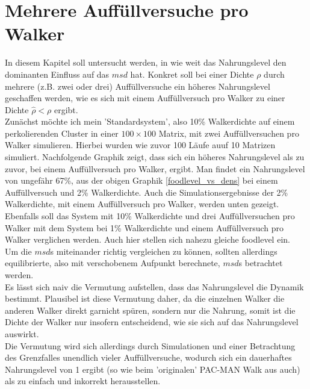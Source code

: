 \documentclass[a4paper, 12pt]{report}
\begin{document}
\section{Mehrere Auffüllversuche pro Walker}
In diesem Kapitel soll untersucht werden, in wie weit das Nahrungslevel den dominanten Einfluss auf das $msd$ hat. Konkret soll bei einer Dichte $\rho$ durch mehrere (z.B. zwei oder drei) Auffüllversuche ein höheres Nahrungslevel geschaffen werden, wie es sich mit einem Auffüllversuch pro Walker zu einer Dichte $\hat{\rho}<\rho$ ergibt.
\\
Zunächst möchte ich mein 'Standardsystem', also 10\% Walkerdichte auf einem perkolierenden Cluster in einer $100\times100$ Matrix, mit zwei Auffüllversuchen pro Walker simulieren. Hierbei wurden wie zuvor 100 Läufe auuf 10 Matrizen simuliert. Nachfolgende Graphik zeigt, dass sich ein höheres Nahrungslevel als zu zuvor, bei einem Auffüllversuch pro Walker, ergibt. Man findet ein Nahrungslevel von ungefähr 67\%, aus der obigen Graphik \ref{foodlevel_vs_dens} bei einem Auffüllversuch und 2\% Walkerdichte. Auch die Simulationsergebnisse der 2\% Walkerdichte, mit einem Auffüllversuch pro Walker, werden unten gezeigt.
\\
Ebenfalls soll das System mit 10\% Walkerdichte und drei Auffüllversuchen pro Walker mit dem System bei 1\% Walkerdichte und einem Auffüllversuch pro Walker verglichen werden. Auch hier stellen sich nahezu gleiche foodlevel ein.
\\
Um die $msd$s miteinander richtig vergleichen zu können, sollten allerdings equilibrierte, also mit verschobenem Aufpunkt berechnete, $msd$s betrachtet werden.
\\
Es lässt sich naiv die Vermutung aufstellen, dass das Nahrungslevel die Dynamik bestimmt. Plausibel ist diese Vermutung daher, da die einzelnen Walker die anderen Walker direkt garnicht spüren, sondern nur die Nahrung, somit ist die Dichte der Walker nur insofern entscheidend, wie sie sich auf das Nahrungslevel auswirkt.
\\
Die Vermutung wird sich allerdings durch Simulationen und einer Betrachtung des Grenzfalles unendlich vieler Auffüllversuche, wodurch sich ein dauerhaftes Nahrungslevel von 1 ergibt (so wie beim 'originalen' PAC-MAN Walk aus \cite{doi:10.1063/1.4999485} auch) als zu einfach und inkorrekt herausstellen.
\end{document}
